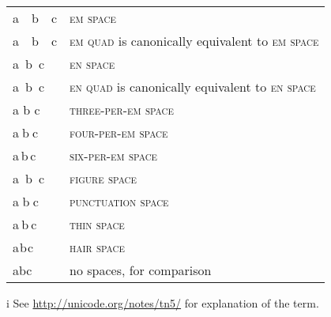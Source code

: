\documentclass{article}
\DeclareRobustCommand{\expl}[1]{{\sffamily #1}}
\newcommand{\enquad}{\textsc{en quad}}
\newcommand{\enspaceC}{\textsc{en space}}
\newcommand{\emquad}{\textsc{em quad}}
\newcommand{\emspaceC}{\textsc{em space}}
\newcommand{\threePerEm}{\textsc{three-per-em space}}
\newcommand{\fourPerEm}{\textsc{four-per-em space}}
\newcommand{\sixPerEm}{\textsc{six-per-em space}}
\newcommand{\figuresp}{\textsc{figure space}}
\newcommand{\punctsp}{\textsc{punctuation space}}
\newcommand{\thinsp}{\textsc{thin space}}
\newcommand{\hairsp}{\textsc{hair space}}
\begin{document}
\begin{center}
\begin{threeparttable}
\begin{tabular}[c]{l | >{\raggedright}p{}}
  a b c & \expl{\emspaceC{}}\tabularnewline
  a b c & \expl{\emquad{} is canonically equivalent{\tnote{i} } to \emspaceC{}}\tabularnewline
  a b c & \expl{\enspaceC{}}\tabularnewline
  a b c & \expl{\enquad{} is canonically equivalent{\tnote{i} } to \enspaceC{}}\tabularnewline
  a b c & \expl{\threePerEm{}}\tabularnewline
  a b c & \expl{\fourPerEm{}}\tabularnewline
  a b c & \expl{\sixPerEm{}}\tabularnewline
  a b c & \expl{\figuresp{}}\tabularnewline
  a b c & \expl{\punctsp{}}\tabularnewline
  a b c & \expl{\thinsp{}}\tabularnewline
  a b c & \expl{\hairsp{}}\tabularnewline
  abc   & \expl{no spaces, for comparison}\tabularnewline
\end{tabular}
\begin{tablenotes}
\item[\expl{i}] \expl{\footnotesize See \url{http://unicode.org/notes/tn5/}
    for explanation of the term.}
\end{tablenotes}
\end{threeparttable}
\end{center}

\pagebreak
\end{document}
